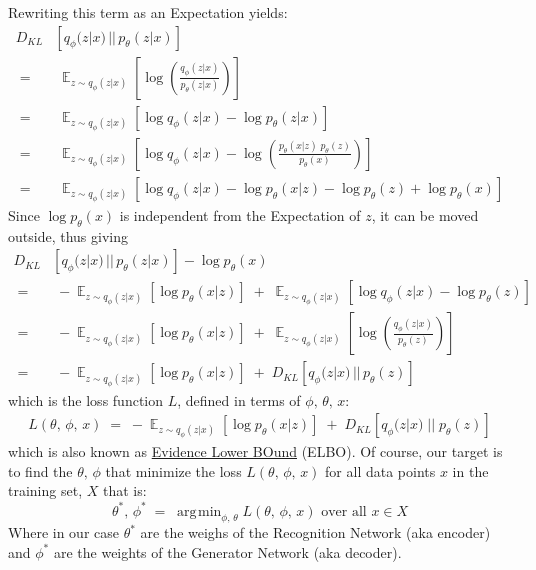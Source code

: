 \documentclass[12pt]{report}
\DeclareMathOperator{\E}{\mathbb{E}}
\DeclareMathOperator*{\argmin}{\arg\!\min}
\begin{document}
Rewriting this term as an Expectation yields:
\begin{align*}
    D_{KL} &\left[ q_{\phi}(z | x) \,||\, p_{\theta}(z | x) \right] \\[2ex]
    \;=&\; \E_{z \sim q_{\phi}(z|x)}\left[ \log \left(
        \frac{q_{\phi}(z | x)}{p_{\theta}(z | x)} \right) \right] \\[2ex]
    \;=&\; \E_{z \sim q_{\phi}(z|x)}\left[ \log q_{\phi}(z | x)
        - \log p_{\theta}(z | x) \right] \\[2ex]
    \;=&\; \E_{z \sim q_{\phi}(z|x)}\left[ \log q_{\phi}(z | x)
        - \log \left( \frac{p_{\theta}(x | z) \; p_{\theta}(z)}
            {p_{\theta}(x)} \right) \right] \\[2ex]
    \;=&\; \E_{z \sim q_{\phi}(z|x)}\left[ \log q_{\phi}(z | x)
        - \log p_{\theta}(x | z) - \log p_{\theta}(z)
            + \log p_{\theta}(x) \right]
\end{align*}
Since $\log p_{\theta}(x)$ is independent from the Expectation of $z$, it can be moved
outside, thus giving
\begin{align*}
    D_{KL} &\left[ q_{\phi}(z | x) \,||\, p_{\theta}(z | x) \right]
        - \log p_{\theta}(x) \\[2ex]
    \;=&\; -\E_{z \sim q_{\phi}(z|x)}[\log p_{\theta}(x | z)] \;+\;
        \E_{z \sim q_{\phi}(z|x)}[\log q_{\phi}(z | x) - \log p_{\theta}(z)] \\[2ex]
    \;=&\; -\E_{z \sim q_{\phi}(z|x)}[\log p_{\theta}(x | z)] \;+\;
        \E_{z \sim q_{\phi}(z|x)} \left[ \log \left(
        \frac{q_{\phi}(z | x)}{p_{\theta}(z)} \right) \right] \\[2ex]
    \;=&\; -\E_{z \sim q_{\phi}(z|x)}[\log p_{\theta}(x | z)] \;+\;
        D_{KL} \left[ q_{\phi}(z | x) \,||\, p_{\theta}(z) \right]
\end{align*}
which is the loss function $L$, defined in terms of $\phi,\, \theta,\, x$:
\begin{align*}
    L(\theta,\, \phi,\, x) \;=\; -\E_{z \sim q_{\phi}(z | x)}
                                    \left[\log p_{\theta}(x | z) \right]\;
                              +\; D_{KL}\left[q_{\phi}(z | x) \;||\; p_{\theta}(z) \right]
\end{align*}
which is also known as
\href{https://en.wikipedia.org/wiki/Variational_Bayesian_methods#Evidence_lower_bound}
{Evidence Lower BOund} (ELBO).
Of course, our target is to find the $\theta,\, \phi$ that minimize the loss
$L(\theta,\, \phi,\, x)$ for all data points $x$ in the training set, $X$ that is:
$$\theta^*,\, \phi^* \;=\; \argmin_{\phi,\, \theta} L(\theta,\, \phi,\, x)
\text{ over all } x \in X$$
Where in our case $\theta^*$ are the weighs of the Recognition Network (aka encoder)
and $\phi^*$ are the weights of the Generator Network (aka decoder). \clearpage
\end{document}
